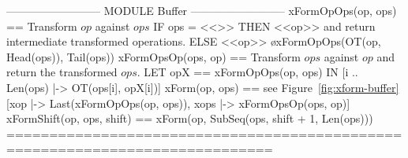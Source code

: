 \documentclass{article}
\begin{document}
\begin{tla}
-------------------------- MODULE Buffer --------------------------
xFormOpOps(op, ops) == \* Transform $op$ against $ops$
    IF ops = <<>> THEN <<op>> \* and return intermediate transformed operations.
    ELSE <<op>> \o xFormOpOps(OT(op, Head(ops)), Tail(ops))
xFormOpsOp(ops, op) == \* Transform $ops$ against $op$ and return the transformed $ops$.
    LET opX == xFormOpOps(op, ops)
    IN  [i  .. Len(ops) |-> OT(ops[i], opX[i])]
xForm(op, ops) == \* see Figure~\ref{fig:xform-buffer}
    [xop |-> Last(xFormOpOps(op, ops)), xops |-> xFormOpsOp(ops, op)]
xFormShift(op, ops, shift) == xForm(op, SubSeq(ops, shift + 1, Len(ops)))
=============================================================================
\end{tla}
\end{document}
